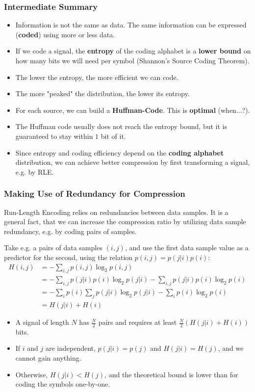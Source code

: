 \documentclass{beamer}
\begin{document}
\begin{frame}
\frametitle{Intermediate Summary}
\begin{itemize}
\item Information is not the same as data. The same information can be expressed (\textbf{coded}) using more or less data.
\item If we code a signal, the \textbf{entropy} of the coding alphabet is a \textbf{lower bound} on how 
many bits we will need per symbol (Shannon's Source Coding Theorem). 
\item {The lower the entropy, the more efficient we can code.}
\item {The more "peaked" the distribution, the lower its entropy.}
\item For each source, we can build a \textbf{Huffman-Code}. This is
  \textbf{optimal} (when...?).
\item The Huffman code usually does not reach the entropy bound, but it is guaranteed to stay within $1$ 
bit of it.
\item Since entropy and coding efficiency depend on the \textbf{coding alphabet} distribution,  we can achieve better compression by first transforming a signal, e.g. by RLE.
\end{itemize}
\end{frame}


\begin{frame}
\frametitle{Making Use of Redundancy for Compression}
\small
Run-Length Encoding relies on redundancies between data samples. 
It is a general fact, that we can increase the compression ratio 
by utilizing data sample redundancy, e.g. by coding pairs of samples.

Take e.g. a pairs of data samples $(i,j)$, and use the first data sample value as a predictor 
for the second, using the relation $p(i,j) = p(j|i)p(i)$:
%
\begin{align*}
H(i,j) &= -\sum\nolimits_{i,j} p(i,j) \log_2 p(i,j)
\\
&= -\sum\nolimits_{i,j} p(j|i)p(i) \log_2 p(j|i) - \sum\nolimits_{i,j} p(j|i)p(i)\log_2 p(i)
\\
&= -\sum\nolimits_{i} p(i) \sum\nolimits_{j} p(j|i) \log_2 p(j|i) - \sum\nolimits_{i} p(i)\log_2 p(i)
\\
&= H(j|i) + H(i)
\end{align*}
\vskip -12pt
\begin{itemize}
\item A signal of length $N$ has $\frac{N}{2}$ pairs and requires at least $\frac{N}{2}\left(H(j|i)+H(i)\right)$ bits.

\item If $i$ and $j$ are independent, $p(j|i)=p(j)$ and $H(j|i)=H(j)$, and we cannot gain anything. 
\item Otherwise, $H(j|i)<H(j)$, and the theoretical bound is lower than for coding the symbols one-by-one.
\end{itemize}
\end{frame}
\end{document}
